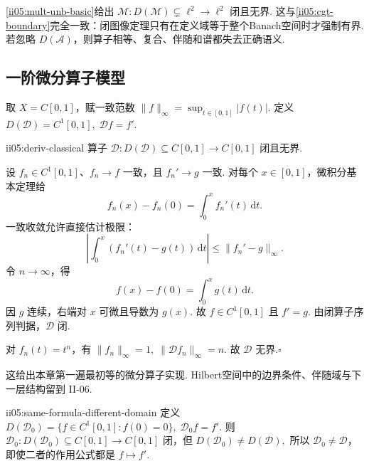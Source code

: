 \begin{FACounterexample}[闭无界算子的真定义域]
\autoref{ii05:mult-unb-basic}给出
\(\displaystyle \mathcal M:D(\mathcal M)\subsetneq\ell^2\to\ell^2\)
闭且无界. 这与\autoref{ii05:cgt-boundary}完全一致：闭图像定理只有在定义域等于整个Banach空间时才强制有界. 若忽略 \(\displaystyle D(\mathcal A)\)，则算子相等、复合、伴随和谱都失去正确语义.
\end{FACounterexample}

\subsection{一阶微分算子模型}

取 \(\displaystyle X=C[0,1]\)，赋一致范数 \(\displaystyle\|f\|_\infty=\sup_{t\in[0,1]}|f(t)|\). 定义
\(\displaystyle D(\mathcal D)=C^1[0,1], \; \mathcal Df=f'.\)

\begin{FAProposition}[B][经典实现闭且无界]{ii05:deriv-classical}
算子
\(\displaystyle \mathcal D:D(\mathcal D)\subseteq C[0,1]\to C[0,1]\)
闭且无界.
\end{FAProposition}

\begin{FAProof}
设 \(\displaystyle f_n\in C^1[0,1]\)、\(\displaystyle f_n\to f\) 一致，且 \(\displaystyle f_n'\to g\) 一致. 对每个 \(\displaystyle x\in[0,1]\)，微积分基本定理给
\[
f_n(x)-f_n(0)=\int_0^x f_n'(t)\,\mathrm{d}t.
\]
一致收敛允许直接估计极限：
\[
\left|
\int_0^x(f_n'(t)-g(t))\,\mathrm{d}t
\right|
\leqslant
\|f_n'-g\|_\infty.
\]
令 \(\displaystyle n\to\infty\)，得
\[
f(x)-f(0)=\int_0^x g(t)\,\mathrm{d}t.
\]
因 \(\displaystyle g\) 连续，右端对 \(\displaystyle x\) 可微且导数为 \(\displaystyle g(x)\). 故 \(\displaystyle f\in C^1[0,1]\) 且 \(\displaystyle f'=g\). 由闭算子序列判据，\(\displaystyle\mathcal D\) 闭.

对 \(\displaystyle f_n(t)=t^n\)，有
\(\displaystyle \|f_n\|_\infty=1, \; \|\mathcal Df_n\|_\infty=n.\)
故 \(\displaystyle\mathcal D\) 无界.\hfill\(\square\)
\end{FAProof}

这给出本章第一遍最初等的微分算子实现. Hilbert空间中的边界条件、伴随域与下一层结构留到 II-06.

\begin{FAProposition}[B][同一微分表达式与不同定义域给出不同算子]{ii05:same-formula-different-domain}
定义
\(\displaystyle D(\mathcal D_0)=\{f\in C^1[0,1]:f(0)=0\}, \; \mathcal D_0f=f'.\)
则 \(\displaystyle\mathcal D_0:D(\mathcal D_0)\subseteq C[0,1]\to C[0,1]\) 闭，但
\(\displaystyle D(\mathcal D_0)\neq D(\mathcal D),\)
所以 \(\displaystyle\mathcal D_0\neq\mathcal D\)，即使二者的作用公式都是 \(\displaystyle f\mapsto f'\).
\end{FAProposition}

